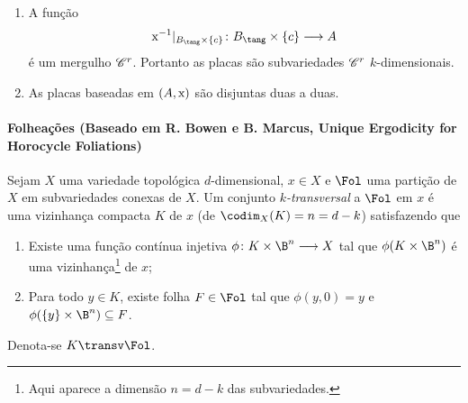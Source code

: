 \begin{prop}
	\begin{enumerate}
	\item A função
		\begin{equation*}
		\x\inv|_{B_\tang \times \{c\}}\colon B_\tang \times \{c\} \to A
		\end{equation*}
é um mergulho $\mathscr{C}^r$. Portanto as placas são subvariedades $\mathscr{C}^r$ $k$-dimensionais.
	\item As placas baseadas em $(A,\mathrm{x})$ são disjuntas duas a duas.
	\end{enumerate}
\end{prop}

\paragraph{Folheações (Baseado em R. Bowen e B. Marcus, Unique Ergodicity for Horocycle Foliations)}

\begin{defi}
Sejam $X$ uma variedade topológica $d$-dimensional, $x \in X$ e $\Fol$ uma partição de $X$ em subvariedades conexas de $X$. Um conjunto \emph{$k$-transversal} a $\Fol$ em $x$ é uma vizinhança compacta $K$ de $x$ (de $\codim_{X}(K) = n = d-k$) satisfazendo que
	\begin{enumerate}
	\item  Existe uma função contínua injetiva $\phi\colon K \times \B^n \to X$ tal que $\phi(K \times \B^n)$ é uma vizinhança\footnote{Aqui aparece a dimensão $n=d-k$ das subvariedades.} de $x$;
	\item Para todo $y \in K$, existe folha $F \in \Fol$ tal que $\phi(y,0) = y$ e $\phi(\{y\} \times \B^n) \subseteq F$.
	\end{enumerate}
Denota-se $K \transv \Fol$.
\end{defi}

